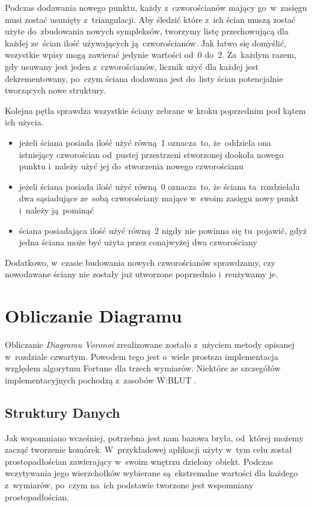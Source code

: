 \documentclass[skorowidz,autorrok,backref,xodstep,oswiadczenie]{wmimgr}
\begin{document}
Podczas dodawania nowego punktu, każdy z~czworościanów mający go~w~zasięgu musi zostać usunięty z~triangulacji. Aby śledzić które z~ich ścian muszą zostać użyte do~zbudowania nowych sympleksów, tworzymy listę przechowującą dla każdej ze~ścian ilość używających ją~czworościanów. Jak łatwo się domyślić, wszystkie wpisy mogą zawierać jedynie wartości od~0 do~2. Za~każdym razem, gdy usuwany jest jeden z~czworościanów, licznik użyć dla każdej jest dekrementowany, po~czym ściana dodawana jest do~listy ścian potencjalnie tworzących nowe struktury.

Kolejna pętla sprawdza wszystkie ściany zebrane w kroku poprzednim pod kątem ich użycia.
\begin{itemize}
\item
jeżeli ściana posiada ilość użyć równą~1 oznacza~to, że~oddziela ona istniejący czworościan od~pustej przestrzeni stworzonej dookoła nowego punktu i~należy użyć jej do~stworzenia nowego czworościanu
\item
jeżeli ściana posiada ilość użyć równą~0 oznacza~to, że ściana ta~rozdzielała dwa sąsiadujące ze~sobą czworościany mające w~swoim zasięgu nowy punkt i~należy ją~pominąć
\item
ściana posiadająca ilość użyć równą~2 nigdy nie powinna się tu~pojawić, gdyż jedna ściana może być użyta przez conajwyżej dwa czworościany
\end{itemize}

Dodatkowo, w~czasie budowania nowych czworościanów sprawdzamy, czy nowodawane ściany nie zostały już utworzone poprzednio i~reużywamy je.

\section{Obliczanie Diagramu}

Obliczanie \emph{Diagramu Voronoi} zrealizowane zostało z~użyciem metody opisanej w~rozdziale czwartym. Powodem tego jest o~wiele prostsza implementacja względem algorytmu Fortune dla trzech wymiarów. Niektóre ze szczegółów implementacyjnych pochodzą z~zasobów W:BLUT \cite{fvan}.

\subsection{Struktury Danych}

Jak wspomniano wcześniej, potrzebna jest nam bazowa bryła, od~której możemy zacząć tworzenie komórek. W~przykładowej aplikacji użyty w~tym celu został prostopadłościan zawierający w~swoim wnętrzu dzielony obiekt. Podczas wczytywania jego wierzchołków wybierane są~ekstremalne wartości dla każdego z~wymiarów, po~czym na~ich podstawie tworzone jest wspomniany prostopadłościan.
\end{document}
